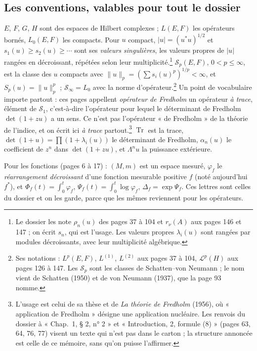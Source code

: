 \documentclass[11pt,a4paper]{article}
\begin{document}
\subsection*{Les conventions, valables pour tout le dossier}

$E$, $F$, $G$, $H$ sont des espaces de Hilbert complexes ; $L(E,F)$ les
opérateurs bornés, $L_0(E,F)$ les compacts. Pour $u$ compact, $|u| = (u^{*}u)^{1/2}$
et $s_1(u) \geq s_2(u) \geq \cdots$ sont ses \emph{valeurs singulières}, les
valeurs propres de $|u|$ rangées en décroissant, répétées selon leur
multiplicité.\footnote{Le dossier les note $\rho_n(u)$ des pages 37 à 104 et
$r_\nu(A)$ aux pages 146 et 147 ; on écrit $s_n$, qui est l'usage. Les
valeurs propres $\lambda_i(u)$ sont rangées par modules décroissants, avec
leur multiplicité algébrique.} $\mathcal{S}_p(E,F)$, $0 < p \leq \infty$, est la classe
des $u$ compacts avec $\|u\|_p = (\sum s_i(u)^p)^{1/p} < \infty$, et
$S_p(u) = \|u\|_p^p$ ; $\mathcal{S}_\infty = L_0$ avec la norme
d'opérateur.\footnote{Ses notations : $L^p(E,F)$, $L^{(1)}$, $L^{(2)}$ aux
pages 37 à 104, $\mathcal{L}^p(H)$ aux pages 126 à 147. Les
$\mathcal{S}_p$ sont les classes de Schatten--von Neumann ; le nom vient de
Schatten (1950) et de von Neumann (1937), que la page 93 nomme.}
Un point de vocabulaire importe partout : ces pages appellent
\emph{opérateur de Fredholm} un opérateur \emph{à trace}, élément
de $\mathcal{S}_1$, c'est-à-dire l'opérateur pour lequel le déterminant de Fredholm
$\det(1+zu)$ a un sens. Ce n'est pas l'opérateur « de Fredholm » de la
théorie de l'indice, et on écrit ici \emph{à trace} partout.\footnote{L'usage
est celui de sa thèse et de \emph{La théorie de Fredholm} (1956), où
« application de Fredholm » désigne une application nucléaire. Les renvois du
dossier à « Chap.\ 1, § 2, n° 2 » et « Introduction, 2, formule (8) » (pages
63, 64, 76, 77) visent un texte qui n'est pas dans le carton ; la structure
annoncée est celle de ce mémoire, sans qu'on puisse l'affirmer.}
$\operatorname{Tr}$ est la trace, $\det(1+u) = \prod (1+\lambda_i(u))$ le
déterminant de Fredholm, $\alpha_n(u)$ le coefficient de $z^n$ dans
$\det(1+zu)$, et $\Lambda^n u$ la puissance extérieure.

Pour les fonctions (pages 6 à 17) : $(M,m)$ est un espace mesuré,
$\varphi_f$ le \emph{réarrangement décroissant} d'une fonction mesurable
positive $f$ (noté aujourd'hui $f^{*}$), et
$\Phi_f(t) = \int_0^t \varphi_f$, $\Psi_f(t) = \int_0^t \log\varphi_f$,
$\Delta_f = \exp\Psi_f$. Ces lettres sont celles du dossier et on les garde,
parce que les mêmes reviennent pour les opérateurs.
\end{document}
